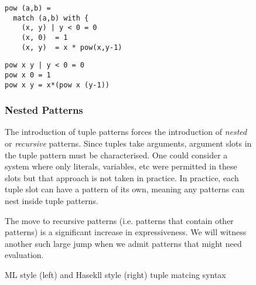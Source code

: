 \documentclass[acmsmall]{acmart}
\begin{document}
\begin{figure}
\begin{minipage}[t]{0.45\linewidth}
\begin{lstlisting}[basicstyle=\small\ttfamily]
pow (a,b) = 
  match (a,b) with {
    (x, y) | y < 0 = 0
    (x, 0)  = 1
    (x, y)  = x * pow(x,y-1)
\end{lstlisting}
\end{minipage}
\hspace{2em}
\begin{minipage}[t]{0.45\linewidth}
\begin{lstlisting}[basicstyle=\small\ttfamily]
pow x y | y < 0 = 0 
pow x 0 = 1
pow x y = x*(pow x (y-1))
\end{lstlisting}
\end{minipage}
\caption{ML style (left) and Hasekll style (right) tuple matcing syntax}
\label{lst:tuple_patterns}

\subsubsection{Nested Patterns}

The introduction of tuple patterns forces the introduction of \emph{nested} or \emph{recursive} patterns.  Since tuples take arguments, argument slots in the tuple pattern must be characterised.  One could consider a system where only literals, variables, etc were permitted in these slots but that approach is not taken in practice.   In practice, each tuple slot can have a pattern of its own, meaning any patterns can nest inside tuple patterns.

The move to recursive patterns (i.e. patterns that contain other patterns) is a significant increase in expressiveness.  We will witness another such large jump when we admit patterns that might need evaluation.

\end{figure}
\end{document}
